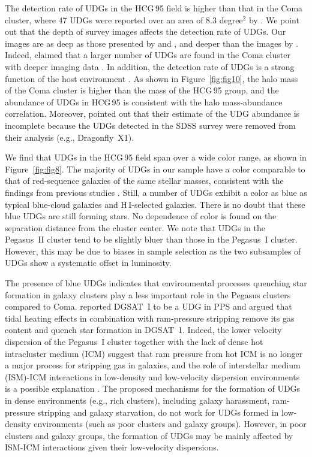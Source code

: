 \documentclass[twocolumn,trackchanges]{aastex61}
\begin{document}
The detection rate of UDGs in the HCG\,95 field is higher than that in the Coma cluster, where 47 UDGs were reported over an area of 8.3 degree$^2$ by \citet{van Dokkum2015a}. We point out that the depth of survey images affects the detection rate of UDGs. Our images are as deep as those presented by \cite{FliriTrujillo2016} and \cite{Koda2015}, and deeper than the images by \cite{van Dokkum2015a}. Indeed, \cite{Koda2015} claimed that a larger number of UDGs are found in the Coma cluster with deeper imaging data \citep{Yagi2016}. In addition, the detection rate of UDGs is a strong function of the host environment \citep{vanderBurg2016,RomanTrujillo2016}. As shown in Figure~\ref{fig:fig10}, the halo mass of the Coma cluster is higher than the mass of the HCG\,95 group, and the abundance of UDGs in HCG\,95 is consistent with the halo mass-abundance correlation. Moreover, \cite{van Dokkum2017} pointed out that their estimate of the UDG abundance is incomplete because the UDGs detected in the SDSS survey were removed from their analysis (e.g., Dragonfly~X1). 



We find that UDGs in the HCG\,95 field span over a wide color range, as shown in Figure~\ref{fig:fig8}. 
The majority of UDGs in our sample have a color comparable to that of red-sequence galaxies of the same stellar masses, consistent with the findings from previous studies \citep{van Dokkum2015a,vanderBurg2016}.   Still, a number of UDGs exhibit a color as blue as typical blue-cloud galaxies and H\,{\small I}-selected galaxies. There is no doubt that these blue UDGs are still forming stars. No dependence of color is found on the separation distance from the cluster center. We note that UDGs in the Pegasus~II cluster tend to be slightly bluer than those in the Pegasus~I cluster.  However, this may be due to biases in sample selection as the two subsamples of UDGs show a systematic offset in luminosity. 

The presence of blue UDGs indicates that  environmental processes quenching star formation in galaxy clusters play a less important role in the Pegasus clusters compared to Coma. \cite{Martinez-Delgado2016} reported DGSAT~I to be a UDG in PPS and argued that tidal heating effects in combination with ram-pressure stripping remove its gas content and quench star formation in DGSAT~1.   Indeed,  the lower velocity dispersion of the Pegasus~I cluster together with the lack of dense hot intracluster medium (ICM) suggest that ram pressure from hot ICM is no longer a major process for stripping gas in galaxies, and the role of interstellar medium (ISM)-ICM interactions in low-density and low-velocity dispersion environments is a possible explanation \citep{Levy2007}. The proposed mechanisms for the formation of UDGs in dense environments (e.g., rich clusters), including galaxy harassment, ram-pressure stripping and galaxy starvation, do not work for UDGs formed in low-density environments (such as poor clusters and galaxy groups).  
However, in poor clusters and galaxy groups, the formation of UDGs may be mainly affected by ISM-ICM interactions given their low-velocity dispersions. 
\end{document}
